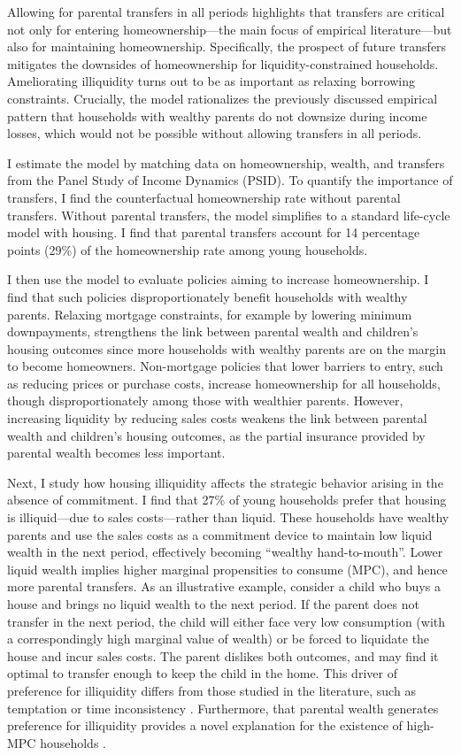 \documentclass[12pt]{article}
\begin{document}
Allowing for parental transfers in all periods highlights that transfers are critical not only for entering homeownership---the main focus of empirical literature---but also for maintaining homeownership. Specifically, the prospect of future transfers mitigates the downsides of homeownership for liquidity-constrained households. Ameliorating illiquidity turns out to be as important as relaxing borrowing constraints. Crucially, the model rationalizes the previously discussed empirical pattern that households with wealthy parents do not downsize during income losses, which would not be possible without allowing transfers in all periods. 

I estimate the model by matching data on homeownership, wealth, and transfers from the Panel Study of Income Dynamics (PSID). To quantify the importance of transfers, I find the counterfactual homeownership rate without parental transfers. Without parental transfers, the model simplifies to a standard life-cycle model with housing. I find that parental transfers account for 14 percentage points (29\%) of the homeownership rate among young households. 

I then use the model to evaluate policies aiming to increase homeownership. I find that such policies disproportionately benefit households with wealthy parents. Relaxing mortgage constraints, for example by lowering minimum downpayments, strengthens the link between parental wealth and children's housing outcomes since more households with wealthy parents are on the margin to become homeowners. Non-mortgage policies that lower barriers to entry, such as reducing prices or purchase costs, increase homeownership for all households, though disproportionately among those with wealthier parents. However, increasing liquidity by reducing sales costs weakens the link between parental wealth and children’s housing outcomes, as the partial insurance provided by parental wealth becomes less important.

Next, I study how housing illiquidity affects the strategic behavior arising in the absence of commitment. I find that 27\% of young households prefer that housing is illiquid---due to sales costs---rather than liquid. These households have wealthy parents and use the sales costs as a commitment device to maintain low liquid wealth in the next period, effectively becoming ``wealthy hand-to-mouth''. Lower liquid wealth implies higher marginal propensities to consume (MPC), and hence more parental transfers. As an illustrative example, consider a child who buys a house and brings no liquid wealth to the next period. If the parent does not transfer in the next period, the child will either face very low consumption (with a correspondingly high marginal value of wealth) or be forced to liquidate the house and incur sales costs. The parent dislikes both outcomes, and may find it optimal to transfer enough to keep the child in the home. This driver of preference for illiquidity differs from those studied in the literature, such as temptation or time inconsistency \citep{attanasio2024temptation,laibson1997golden}. Furthermore, that parental wealth generates preference for illiquidity provides a novel explanation for the existence of high-MPC households \cite[see e.g.,][]{kaplan2022marginal}. 
\end{document}
